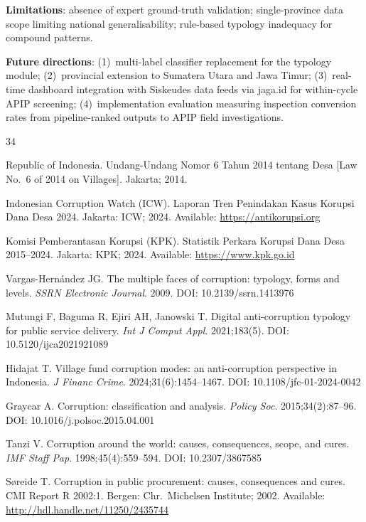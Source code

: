\documentclass[3p,times,procedia]{elsarticle}
\begin{document}
\textbf{Limitations}: absence of expert ground-truth validation; single-province data scope limiting national generalisability; rule-based typology inadequacy for compound patterns.

\textbf{Future directions}: (1)~multi-label classifier replacement for the typology module; (2)~provincial extension to Sumatera Utara and Jawa Timur; (3)~real-time dashboard integration with Siskeudes data feeds via jaga.id for within-cycle APIP screening; (4)~implementation evaluation measuring inspection conversion rates from pipeline-ranked outputs to APIP field investigations.

\begin{thebibliography}{34}

Republic of Indonesia. Undang-Undang Nomor 6 Tahun 2014 tentang Desa [Law No.~6 of 2014 on Villages]. Jakarta; 2014.

Indonesian Corruption Watch (ICW). Laporan Tren Penindakan Kasus Korupsi Dana Desa 2024. Jakarta: ICW; 2024. Available: \url{https://antikorupsi.org}

Komisi Pemberantasan Korupsi (KPK). Statistik Perkara Korupsi Dana Desa 2015--2024. Jakarta: KPK; 2024. Available: \url{https://www.kpk.go.id}

Vargas-Hernández JG. The multiple faces of corruption: typology, forms and levels. \textit{SSRN Electronic Journal}. 2009. DOI: 10.2139/ssrn.1413976

Mutungi F, Baguma R, Ejiri AH, Janowski T. Digital anti-corruption typology for public service delivery. \textit{Int J Comput Appl}. 2021;183(5). DOI: 10.5120/ijca2021921089

Hidajat T. Village fund corruption modes: an anti-corruption perspective in Indonesia. \textit{J Financ Crime}. 2024;31(6):1454--1467. DOI: 10.1108/jfc-01-2024-0042

Graycar A. Corruption: classification and analysis. \textit{Policy Soc}. 2015;34(2):87--96. DOI: 10.1016/j.polsoc.2015.04.001

Tanzi V. Corruption around the world: causes, consequences, scope, and cures. \textit{IMF Staff Pap}. 1998;45(4):559--594. DOI: 10.2307/3867585

S{\o}reide T. Corruption in public procurement: causes, consequences and cures. CMI Report R 2002:1. Bergen: Chr.\ Michelsen Institute; 2002. Available: \url{http://hdl.handle.net/11250/2435744}


\end{thebibliography}
\end{document}
